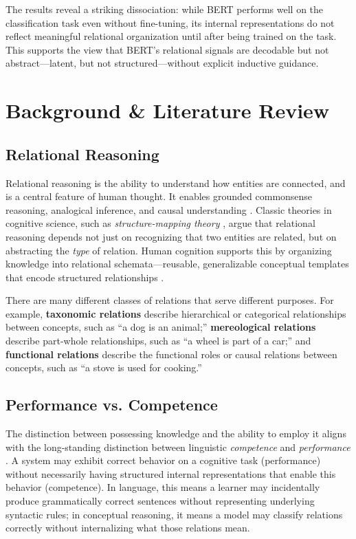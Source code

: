 \documentclass[stu,floatsintext]{apa7}
\begin{document}
The results reveal a striking dissociation: while BERT performs well on the classification task even without fine-tuning, its internal representations do not reflect meaningful relational organization until after being trained on the task. This supports the view that BERT's relational signals are decodable but not abstract—latent, but not structured—without explicit inductive guidance.

\section{Background \& Literature Review}

\subsection{Relational Reasoning}

Relational reasoning is the ability to understand how entities are connected, and is a central feature of human thought. It enables grounded commonsense reasoning, analogical inference, and causal understanding \parencite{davis2015commonsense, cattell1971abilities}.
Classic theories in cognitive science, such as \textit{structure-mapping theory} \parencite{Gentner1983}, argue that relational reasoning depends not just on recognizing that two entities are related, but on abstracting the \textit{type} of relation. Human cognition supports this by organizing knowledge into relational schemata—reusable, generalizable conceptual templates that encode structured relationships \parencite{gentner2005relational}.

There are many different classes of relations that serve different purposes. For example, \textbf{taxonomic relations} describe hierarchical or categorical relationships between concepts, such as ``a dog is an animal;'' \textbf{mereological relations} describe part-whole relationships, such as ``a wheel is part of a car;'' and \textbf{functional relations} describe the functional roles or causal relations between concepts, such as ``a stove is used for cooking.''

\subsection{Performance vs. Competence}

The distinction between possessing knowledge and the ability to employ it aligns with the long-standing distinction between linguistic \textit{competence} and \textit{performance} \parencite{Chomsky1965, Kaufer1979}. A system may exhibit correct behavior on a cognitive task (performance) without necessarily having structured internal representations that enable this behavior (competence). In language, this means a learner may incidentally produce grammatically correct sentences without representing underlying syntactic rules; in conceptual reasoning, it means a model may classify relations correctly without internalizing what those relations mean.
\end{document}
